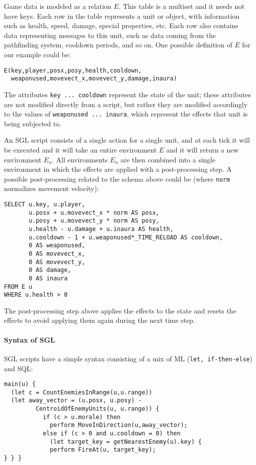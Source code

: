 %
%

Game data is modeled as a relation $E$. This table is a multiset and it needs not have keys. Each row in the table represents a unit or object, with information such as health, speed, damage, special properties, etc. Each row also contains data representing messages to this unit, such as data coming from the pathfinding system, cooldown periods, and so on. One possible definition of $E$ for our example could be:

\begin{lstlisting}
E(key,player,posx,posy,health,cooldown,
  weaponused,movevect_x,movevect_y,damage,inaura)
\end{lstlisting}

The attributes \texttt{key ... cooldown} represent the state of the unit; these attributes are not modified directly from a script, but rather they are modified accordingly to the values of \texttt{weaponused ... inaura}, which represent the effects that unit is being subjected to.

An SGL script consists of a single action for a single unit, and at each tick it will be executed and it will take an entire environment $E$ and it will return a new environment $E_u$. All environments $E_u$ are then combined into a single environment in which the effects are applied with a post-processing step. A possible post-processing related to the schema above could be (where \texttt{norm} normalizes movement velocity):

\begin{lstlisting}
SELECT u.key, u.player, 
       u.posx + u.movevect_x * norm AS posx, 
       u.posy + u.movevect_y * norm AS posy, 
       u.health - u.damage + u.inaura AS health, 
       u.cooldown - 1 + u.weaponused*_TIME_RELOAD AS cooldown, 
       0 AS weaponused, 
       0 AS movevect_x, 
       0 AS movevect_y, 
       0 AS damage, 
       0 AS inaura
FROM E u 
WHERE u.health > 0
\end{lstlisting}

The post-processing step above applies the effects to the state and resets the effects to avoid applying them again during the next time step.

\paragraph{Syntax of SGL}
SGL scripts have a simple syntax consisting of a mix of ML (\texttt{let, if-then-else}) and SQL:

\begin{lstlisting}
main(u) { 
  (let c = CountEnemiesInRange(u,u.range)) 
  (let away_vector = (u.posx, u.posy) -
         CentroidOfEnemyUnits(u, u.range)) { 
           if (c > u.morale) then
             perform MoveInDirection(u,away_vector); 
           else if (c > 0 and u.cooldown = 0) then
             (let target_key = getNearestEnemy(u).key) { 
             perform FireAt(u, target_key);
} } }
\end{lstlisting}

